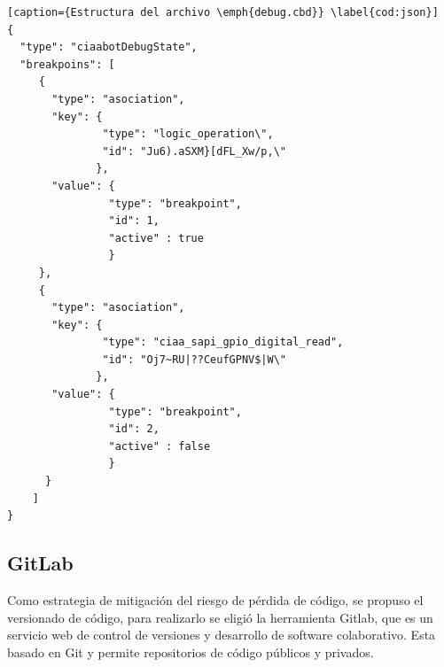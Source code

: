 \begin{lstlisting}[caption={Estructura del archivo \emph{debug.cbd}} \label{cod:json}] 
{
  "type": "ciaabotDebugState",
  "breakpoins": [
     {
       "type": "asociation",
       "key": {
               "type": "logic_operation\",
               "id": "Ju6).aSXM}[dFL_Xw/p,\"
              },
       "value": {
                "type": "breakpoint",
                "id": 1,
                "active" : true
                }
     }, 
     {
       "type": "asociation",
       "key": {
               "type": "ciaa_sapi_gpio_digital_read",
               "id": "Oj7~RU|??CeufGPNV$|W\"
              },
       "value": {
                "type": "breakpoint",
                "id": 2,
                "active" : false
                }
      }
    ]
}
\end{lstlisting}


\subsection{GitLab}
\label{subsec:GitLab}

Como estrategia de mitigación del riesgo de pérdida de código, se propuso el versionado de código, para realizarlo se eligió la herramienta Gitlab, que es un servicio web de control de versiones y desarrollo de software colaborativo. Esta basado en Git y permite repositorios de código públicos y privados. 

